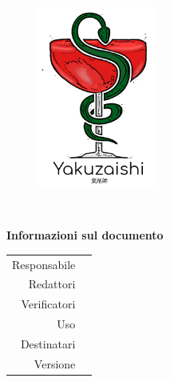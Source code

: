\thispagestyle{empty}

\begin{figure}
	\centering
	\includegraphics[width=150px]{../template/images/logo}
\end{figure}

\hspace{2pt}

\begin{center}
	\textbf{\Large \documentName}\\[0.2cm]
\end{center}

\vspace{2pt}

\begin{center}
	\groupEmail
\end{center}

\vspace{2pt}

\begin{center}
	\textbf{Informazioni sul documento}
\end{center}

\begin{table}[H]
	\centering
	\renewcommand{\arraystretch}{1.4}
	\begin{tabular}{r|l}
		Responsabile & \documentApprovers\vspace{2.5pt}\\
		Redattori & \documentEditors\vspace{2.5pt}\\
		Verificatori & \documentVerifiers\vspace{2.5pt}\\
		Uso & \documentUsage\vspace{2.5pt}\\
		Destinatari & \documentAddressee\vspace{2.5pt}\\
		Versione & \documentVersion\\
	\end{tabular}
\end{table}

